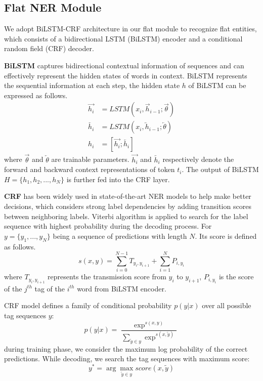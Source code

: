 \documentclass[11pt,a4paper]{article}
\begin{document}
\subsection{Flat NER Module}
We adopt BiLSTM-CRF architecture \cite{lample2016neural, ma2016end, yang2018ncrf,luo2019hierarchical} in our flat module to recognize flat entities, which consists of a bidirectional LSTM (BiLSTM) encoder and a conditional random field (CRF) decoder.

\textbf{BiLSTM} 
captures bidirectional contextual information of sequences and can effectively represent the hidden states of words in context.
 BiLSTM represents the sequential information at each step, the hidden state $h$ of BiLSTM can be expressed as follows.
\begin{equation}
    \begin{aligned}
        \overrightarrow{h_i} &= LSTM(x_i, \overrightarrow{h}_{i-1}; \overrightarrow{\theta}) \\
        \overleftarrow{h_i} &= LSTM(x_i, \overleftarrow{h}_{i-1}; \overleftarrow{\theta}) \\
        h_i &= [\overrightarrow{h_i}; \overleftarrow{h_i}]
    \end{aligned}
\end{equation}
where $\overrightarrow{\theta}$ and $\overleftarrow{\theta}$ are trainable parameters. $\overrightarrow{h_i}$ and $\overleftarrow{h_i}$ respectively denote the forward and backward  context representations of token $t_i$.
The output of BiLSTM $H= \{h_1, h_2, ..., h_N\}$ is further fed into the CRF layer.

\textbf{CRF}
 \cite{Lafferty:01} has been widely used in state-of-the-art NER models \cite{lample2016neural,ma2016end,yang2018ncrf} to help make better decisions,  which considers strong label dependencies by adding transition scores between neighboring labels.
Viterbi algorithm is applied to search for the label sequence with  highest probability during the decoding process.
For $y=\{y_1,...,y_N\}$ being a sequence of predictions with length $N$. Its score is defined as follows.
\begin{equation}  
s(x, y) = \sum_{i=0}^{N-1} T_{y_i, y_{i+1}} + \sum_{i=1}^{N} P_{i, y_i}
\end{equation}
where $T_{y_i, y_{i+1}}$ represents the transmission score  from  $y_i$ to $y_{i+1}$,
$ P_{i, y_i}$  is the score of the $j^{th}$ tag of the $i^{th}$ word from BiLSTM encoder.

CRF model defines a family of conditional probability $p(y|x)$ over all possible tag sequences $y$:
\begin{equation} 
p(y|x) = \frac{\exp^{s(x,y)}}{\sum_{\tilde{y}\in y}\exp^{s(x, \tilde{y})}} 
\end{equation}
during training phase, we consider the maximum log probability
of the correct predictions. 
While decoding, we search the tag sequences with maximum score:
\begin{equation}  
y^{*} = \arg\max_{\tilde{y} \in y} score(x, \tilde{y})
\end{equation}
\end{document}
